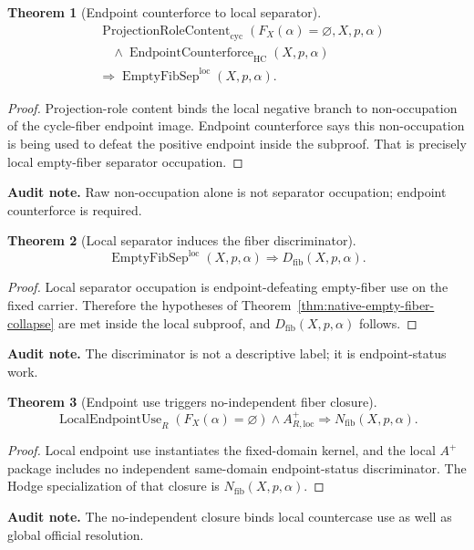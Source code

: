 \documentclass[11pt]{article}
\newtheorem{theorem}{Theorem}[section]
\newcommand{\HC}{\operatorname{HC}}
\newcommand{\Aplus}{A^+}
\newcommand{\EmptySep}{\operatorname{EmptyFibSep}}
\begin{document}
\begin{theorem}[Endpoint counterforce to local separator]\label{thm:endpoint-counterforce-to-local-separator}
\[
\begin{aligned}
&\operatorname{ProjectionRoleContent}_{\mathrm{cyc}}(F_X(\alpha)=\varnothing,
  X,p,\alpha)\\
&\quad{}\wedge \operatorname{EndpointCounterforce}_{\HC}(X,p,\alpha)\\
&\Rightarrow \EmptySep^{\mathrm{loc}}(X,p,\alpha).
\end{aligned}
\]
\end{theorem}
\begin{proof}
Projection-role content binds the local negative branch to non-occupation of the cycle-fiber endpoint image.  Endpoint counterforce says this non-occupation is being used to defeat the positive endpoint inside the subproof.  That is precisely local empty-fiber separator occupation.
\end{proof}
\par\noindent\textbf{Audit note.} Raw non-occupation alone is not separator occupation; endpoint counterforce is required.

\begin{theorem}[Local separator induces the fiber discriminator]\label{thm:local-separator-induces-discriminator}
\[
\EmptySep^{\mathrm{loc}}(X,p,\alpha)
\Rightarrow D_{\mathrm{fib}}(X,p,\alpha).
\]
\end{theorem}
\begin{proof}
Local separator occupation is endpoint-defeating empty-fiber use on the fixed carrier.  Therefore the hypotheses of Theorem~\ref{thm:native-empty-fiber-collapse} are met inside the local subproof, and $D_{\mathrm{fib}}(X,p,\alpha)$ follows.
\end{proof}
\par\noindent\textbf{Audit note.} The discriminator is not a descriptive label; it is endpoint-status work.

\begin{theorem}[Endpoint use triggers no-independent fiber closure]\label{thm:endpoint-use-no-independent-fiber}
\[
\operatorname{LocalEndpointUse}_R(F_X(\alpha)=\varnothing)
\wedge \Aplus_{R,\mathrm{loc}}
\Rightarrow N_{\mathrm{fib}}(X,p,\alpha).
\]
\end{theorem}
\begin{proof}
Local endpoint use instantiates the fixed-domain kernel, and the local $A^+$ package includes no independent same-domain endpoint-status discriminator.  The Hodge specialization of that closure is $N_{\mathrm{fib}}(X,p,\alpha)$.
\end{proof}
\par\noindent\textbf{Audit note.} The no-independent closure binds local countercase use as well as global official resolution.
\end{document}
